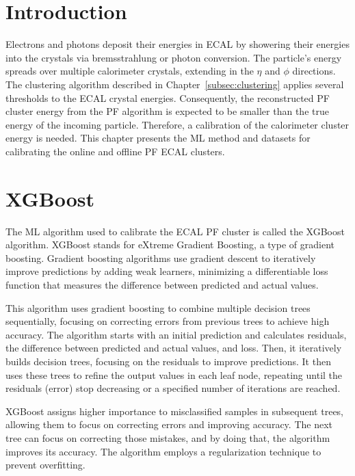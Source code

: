 
\section{Introduction}
Electrons and photons deposit their energies in ECAL by showering their energies into the crystals via bremsstrahlung or photon conversion.
The particle's energy spreads over multiple calorimeter crystals, extending in the $\eta$ and $\phi$ directions.
The clustering algorithm described in Chapter~\ref{subsec:clustering} applies several thresholds to the ECAL crystal energies.
Consequently, the reconstructed PF cluster energy from the PF algorithm is expected to be smaller than the true energy of the incoming particle.
Therefore, a calibration of the calorimeter cluster energy is needed. This chapter presents the ML method and datasets for calibrating the online and offline PF ECAL clusters.

\section{XGBoost}

The ML algorithm used to calibrate the ECAL PF cluster is called the XGBoost algorithm.
XGBoost stands for eXtreme Gradient Boosting, a type of gradient boosting.
Gradient boosting algorithms use gradient descent to iteratively improve predictions by adding weak learners, minimizing a differentiable loss function that measures the difference between predicted and actual values.

This algorithm uses gradient boosting to combine multiple decision trees sequentially, focusing on correcting errors from previous trees to achieve high accuracy.
The algorithm starts with an initial prediction and calculates residuals, the difference between predicted and actual values, and loss.
Then, it iteratively builds decision trees, focusing on the residuals to improve predictions.
It then uses these trees to refine the output values in each leaf node, repeating until the residuals (error) stop decreasing or a specified number of iterations are reached.

XGBoost assigns higher importance to misclassified samples in subsequent trees, allowing them to focus on correcting errors and improving accuracy.
The next tree can focus on correcting those mistakes, and by doing that, the algorithm improves its accuracy. The algorithm employs a regularization technique to prevent overfitting.  


